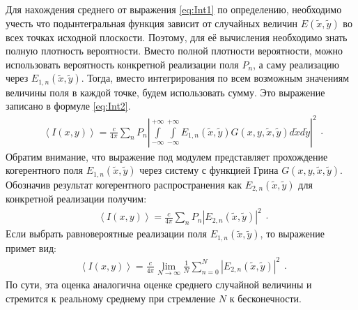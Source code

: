 Для нахождения среднего от выражения \ref{eq:Int1} по определению, необходимо учесть что подынтегральная функция зависит от случайных величин $E(\tilde{x},\tilde{y})$ во всех точках исходной плоскости. Поэтому, для её вычисления необходимо знать полную плотность вероятности. Вместо полной плотности вероятности, можно использовать вероятность конкретной реализации поля $P_n$, а саму реализацию через $E_{1,n}(\tilde{x},\tilde{y})$. Тогда, вместо интегрирования по всем возможным значениям величины поля в каждой точке, будем использовать сумму. Это выражение записано в формуле \ref{eq:Int2}.
\begin{equation}\label{eq:Int2}
	\begin{gathered}
		\left<I(x,y)\right> =
		\frac{c}{4\pi} \sum\limits_{n}P_n
		\left|\int\limits_{-\infty}^{+\infty}\int\limits_{-\infty}^{+\infty}
		E_{1,n}(\tilde{x},\tilde{y})
		G(x,y,\tilde{x},\tilde{y})d\tilde{x}d\tilde{y}\right|^2
	\end{gathered}.
\end{equation}
Обратим внимание, что выражение под модулем представляет прохождение когерентного поля $E_{1,n}(\tilde{x},\tilde{y})$ через систему с функцией Грина $G(x,y,\tilde{x},\tilde{y})$. Обозначив результат когерентного распространения как $E_{2,n}(\tilde{x},\tilde{y})$ для конкретной реализации получим:
\begin{equation}\label{eq:Int3}
	\begin{gathered}
		\left<I(x,y)\right> =
		\frac{c}{4\pi} \sum\limits_{n}P_n
		\left|
		E_{2,n}(\tilde{x},\tilde{y})
		\right|^2
	\end{gathered}.
\end{equation}
Если выбрать равновероятные реализации поля $E_{1,n}(\tilde{x},\tilde{y})$, то выражение примет вид:
\begin{equation}\label{eq:IntMain}
	\begin{gathered}
		\left<I(x,y)\right> =
		\frac{c}{4\pi} \lim\limits_{N \rightarrow \infty}\frac{1}{N}\sum\limits_{n=0}^{N}
		\left|E_{2,n}(\tilde{x},\tilde{y})\right|^2
	\end{gathered}.
\end{equation}
По сути, эта оценка аналогична оценке среднего случайной величины и стремится к реальному среднему при стремление $N$ к бесконечности.



